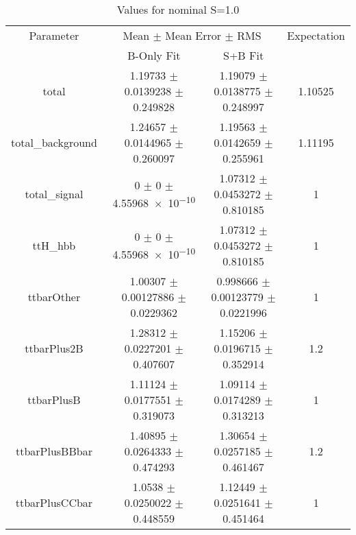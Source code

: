 \begin{table}
\centering
\caption{Values for nominal S=1.0}
\begin{tabular}{cccc}
\toprule
Parameter & \multicolumn{2}{c}{Mean $\pm$ Mean Error $\pm$ RMS} & Expectation\\
 & B-Only Fit & S+B Fit & \\
\midrule
total & \num{1.19733} $\pm$ \num{0.0139238} $\pm$ \num{0.249828} & \num{1.19079} $\pm$ \num{0.0138775} $\pm$ \num{0.248997} & \num{1.10525}\\
total\_background & \num{1.24657} $\pm$ \num{0.0144965} $\pm$ \num{0.260097} & \num{1.19563} $\pm$ \num{0.0142659} $\pm$ \num{0.255961} & \num{1.11195}\\
total\_signal & \num{0} $\pm$ \num{0} $\pm$ \num{4.55968e-10} & \num{1.07312} $\pm$ \num{0.0453272} $\pm$ \num{0.810185} & \num{1}\\
ttH\_hbb & \num{0} $\pm$ \num{0} $\pm$ \num{4.55968e-10} & \num{1.07312} $\pm$ \num{0.0453272} $\pm$ \num{0.810185} & \num{1}\\
ttbarOther & \num{1.00307} $\pm$ \num{0.00127886} $\pm$ \num{0.0229362} & \num{0.998666} $\pm$ \num{0.00123779} $\pm$ \num{0.0221996} & \num{1}\\
ttbarPlus2B & \num{1.28312} $\pm$ \num{0.0227201} $\pm$ \num{0.407607} & \num{1.15206} $\pm$ \num{0.0196715} $\pm$ \num{0.352914} & \num{1.2}\\
ttbarPlusB & \num{1.11124} $\pm$ \num{0.0177551} $\pm$ \num{0.319073} & \num{1.09114} $\pm$ \num{0.0174289} $\pm$ \num{0.313213} & \num{1}\\
ttbarPlusBBbar & \num{1.40895} $\pm$ \num{0.0264333} $\pm$ \num{0.474293} & \num{1.30654} $\pm$ \num{0.0257185} $\pm$ \num{0.461467} & \num{1.2}\\
ttbarPlusCCbar & \num{1.0538} $\pm$ \num{0.0250022} $\pm$ \num{0.448559} & \num{1.12449} $\pm$ \num{0.0251641} $\pm$ \num{0.451464} & \num{1}\\
\bottomrule
\end{tabular}
\end{table}